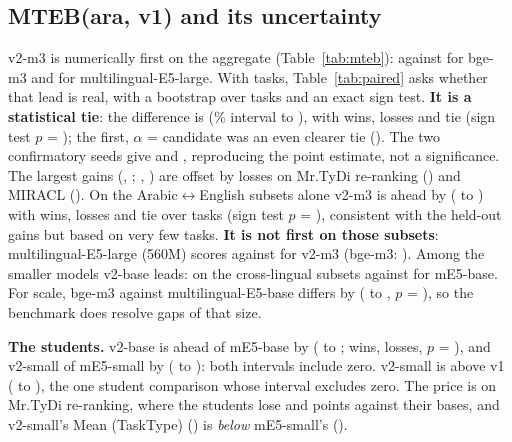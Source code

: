 \documentclass[11pt]{article}
\begin{document}
\subsection{MTEB(ara, v1) and its uncertainty}
v2-m3 is numerically first on the aggregate (Table~\ref{tab:mteb}): \NumMtebVTwoMTask{} against \NumMtebBgeTask{} for bge-m3 and \NumMtebELargeTask{} for multilingual-E5-large.
With \NumMtebTasks{} tasks, Table~\ref{tab:paired} asks whether that lead is real, with a bootstrap over tasks and an exact sign test.
\textbf{It is a statistical tie}: the difference is \NumPairedMMeanDiff{} (\NumCiLevel\% interval \NumPairedMCiLo{} to \NumPairedMCiHi), with \NumPairedMWins{} wins, \NumPairedMLosses{} losses and \NumPairedMTies{} tie (sign test $p$ = \NumPairedMSignP); the first, $\alpha$ = \NumWiseAlphaFirst{} candidate was an even clearer tie (\NumPairedFMeanDiff).
The two confirmatory seeds give \NumMtebSixteenSeedTask{} and \NumMtebSeventeenSeedTask{}, reproducing the point estimate, not a significance.
The largest gains (\NumPairedMBestTask, \NumPairedMBestGain; \NumPairedMSecondTask, \NumPairedMSecondGain) are offset by losses on Mr.TyDi re-ranking (\NumPairedMNamaaGain) and MIRACL (\NumPairedMMiraclGain).
On the Arabic$\leftrightarrow$English subsets alone v2-m3 is ahead by \NumPairedMCrossDiff{} (\NumPairedMCrossCiLo{} to \NumPairedMCrossCiHi) with \NumPairedMCrossWins{} wins, \NumPairedMCrossLosses{} losses and \NumPairedMCrossTies{} tie over \NumPairedMCrossTasks{} tasks (sign test $p$ = \NumPairedMCrossP), consistent with the held-out gains but based on very few tasks.
\textbf{It is not first on those subsets}: multilingual-E5-large (560M) scores \NumMtebELargeCross{} against \NumMtebVTwoMCross{} for v2-m3 (bge-m3: \NumMtebBgeCross).
Among the smaller models v2-base leads: \NumMtebVTwoBCross{} on the cross-lingual subsets against \NumMtebEBaseCross{} for mE5-base.
For scale, bge-m3 against multilingual-E5-base differs by \NumPairedRefMeanDiff{} (\NumPairedRefCiLo{} to \NumPairedRefCiHi, $p$ = \NumPairedRefSignP), so the benchmark does resolve gaps of that size.

\textbf{The students.} v2-base is ahead of mE5-base by \NumPairedBMeanDiff{} (\NumPairedBCiLo{} to \NumPairedBCiHi{}; \NumPairedBWins{} wins, \NumPairedBLosses{} losses, $p$ = \NumPairedBSignP), and v2-small of mE5-small by \NumPairedSMeanDiff{} (\NumPairedSCiLo{} to \NumPairedSCiHi): both intervals include zero.
v2-small is \NumPairedVMeanDiff{} above v1 (\NumPairedVCiLo{} to \NumPairedVCiHi{}), the one student comparison whose interval excludes zero.
The price is on Mr.TyDi re-ranking, where the students lose \NumGuardBGapNamaa{} and \NumGuardSGapNamaa{} points against their bases, and v2-small's Mean (TaskType) (\NumMtebVTwoSType) is \emph{below} mE5-small's (\NumMtebESmallType).
\end{document}
